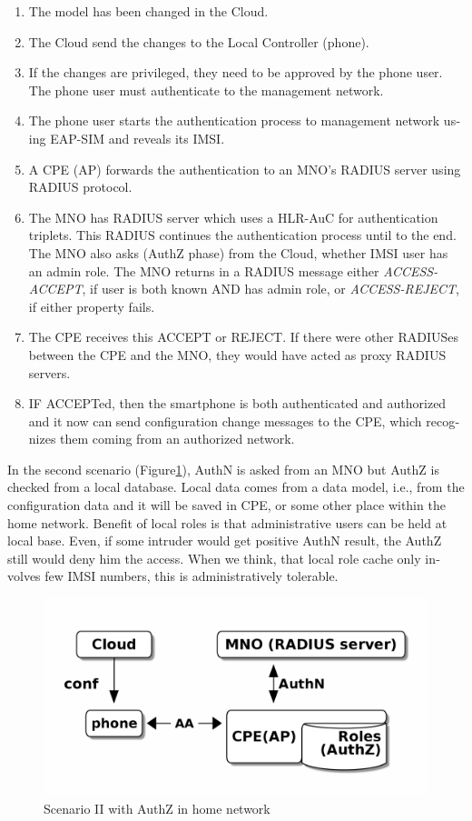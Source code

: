 \documentclass[12pt,a4paper,english]{tutthesis}
\begin{document}
\begin{otherlanguage}{english}
\begin{enumerate}
\item The model has been changed in the Cloud.
\item The Cloud send the changes to the Local Controller (phone).
\item If the changes are privileged, they need to be approved by the
phone user.  The phone user must authenticate to the management
network.
\item The phone user starts the authentication process to management
network using EAP-SIM and reveals its IMSI.
\item A CPE (AP) forwards the authentication to an MNO's RADIUS server
using RADIUS protocol.
\item The MNO has RADIUS server which uses a HLR-AuC for authentication
triplets. This RADIUS continues the authentication process until to
the end. The MNO also asks (AuthZ phase) from the Cloud, whether
IMSI user has an admin role.  The MNO returns in a RADIUS message
either \emph{ACCESS-ACCEPT}, if user is both known AND has admin role,
or \emph{ACCESS-REJECT}, if either property fails.
\item The CPE receives this ACCEPT or REJECT. If there were other
RADIUSes between the CPE and the MNO, they would have acted as
proxy RADIUS servers.
\item IF ACCEPTed, then the smartphone is both authenticated and
authorized and it now can send configuration change messages to the
CPE, which recognizes them coming from an authorized network.
\end{enumerate}






\label{scenario-ii}

In the second scenario (Figure\ref{fig:scenario-II}), AuthN is asked from an MNO but
AuthZ is checked from a local database. Local data comes from a data
model, i.e., from the configuration data and it will be saved in CPE,
or some other place within the home network. Benefit of local roles is
that administrative users can be held at local base. Even, if some
intruder would get positive AuthN result, the AuthZ still would deny
him the access. When we think, that local role cache only involves few
IMSI numbers, this is administratively tolerable.


\begin{figure}[htb]
\centering
\includegraphics[width=.9\linewidth]{scenII.png}
\caption{\label{fig:scenario-II}Scenario II with AuthZ in home network}
\end{figure}



\end{otherlanguage}
\end{document}
